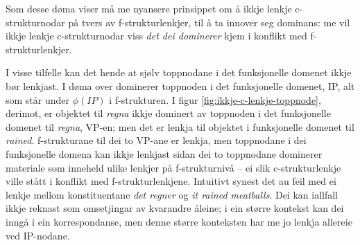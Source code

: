 \documentclass[12pt,a4paper,oneside,draft]{report}
\begin{document}
Som desse døma viser må me nyansere prinsippet om å ikkje lenkje
c\hyp{}strukturnodar på tvers av f\hyp{}strukturlenkjer, til å ta innover
seg dominans: me vil ikkje lenkje c\hyp{}strukturnodar viss \emph{det dei dominerer} kjem i konflikt med f\hyp{}strukturlenkjer.


I visse tilfelle kan det hende at sjølv toppnodane i det funksjonelle
domenet ikkje bør lenkjast. I døma over dominerer toppnoden i det
funksjonelle domenet, IP, alt som står under $\phi(IP)$ i
f\hyp{}strukturen.  I figur \ref{fig:ikkje-c-lenkje-toppnode}, derimot, er
objektet til \emph{regna} ikkje dominert av toppnoden i det funksjonelle
domenet til \emph{regna}, VP-en; men det er lenkja til objektet i
funksjonelle domenet til \emph{rained}. f\hyp{}strukturane til dei to VP-ane er
lenkja, men toppnodane i dei funksjonelle domena kan ikkje lenkjast
sidan dei to toppnodane dominerer materiale som inneheld ulike lenkjer
på f\hyp{}strukturnivå -- ei slik c\hyp{}strukturlenkje ville stått i konflikt
med f\hyp{}strukturlenkjene. Intuitivt synest det au feil med ei lenkje
mellom konstituentane \emph{det regner} og \emph{it rained meatballs}. Dei kan
iallfall ikkje reknast som omsetjingar av kvarandre åleine; i ein
større kontekst kan dei inngå i ein korrespondanse, men denne større
konteksten har me jo lenkja allereie ved IP-nodane.
\end{document}
